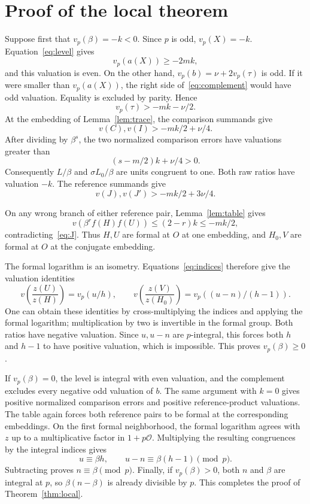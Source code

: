 \documentclass[11pt,a4paper]{article}
\begin{document}
\section{Proof of the local theorem}

Suppose first that $v_p(\beta)=-k<0$. Since $p$ is odd,
$v_p(X)=-k$. Equation~\eqref{eq:level} gives
\[
                     v_p(a(X))\ge-2mk,
\]
and this valuation is even. On the other hand,
$v_p(b)=\nu+2v_p(\tau)$ is odd. If it were smaller than
$v_p(a(X))$, the right side of~\eqref{eq:complement} would
have odd valuation. Equality is excluded by parity. Hence
\begin{equation}\label{eq:tau}
                         v_p(\tau)>-mk-\nu/2.
\end{equation}
At the embedding of Lemma~\ref{lem:trace}, the comparison summands give
\[
 v(C),v(I)>-mk/2+\nu/4.
\]
After dividing by $\beta^s$, the two normalized comparison errors
have valuations greater than
\[
                           (s-m/2)k+\nu/4>0.
\]
Consequently $L/\beta$ and $\sigma L_0/\beta$ are units congruent
to one. Both raw ratios have valuation $-k$.
The reference summands give
\begin{equation}\label{eq:J}
                        v(J),v(J')>-mk/2+3\nu/4.
\end{equation}

On any wrong branch of either reference pair,
Lemma~\ref{lem:table} gives
\[
                 v(\beta^r f(H)f(U))\le(2-r)k\le-mk/2,
\]
contradicting~\eqref{eq:J}. Thus $H,U$ are formal at $O$ at one
embedding, and $H_0,V$ are formal at $O$ at the conjugate embedding.

The formal logarithm is an isometry. Equations~\eqref{eq:indices}
therefore give the valuation identities
\[
 v\!\left(\frac{z(U)}{z(H)}\right)=v_p(u/h),\qquad
 v\!\left(\frac{z(V)}{z(H_0)}\right)
                              =v_p((u-n)/(h-1)).
\]
One can obtain these identities by cross-multiplying the indices
and applying the formal logarithm; multiplication by two is
invertible in the formal group. Both ratios have negative valuation.
Since $u,u-n$ are $p$-integral, this forces both $h$ and $h-1$
to have positive valuation, which is impossible. This proves
$v_p(\beta)\ge0$.

If $v_p(\beta)=0$, the level is integral with even valuation, and
the complement excludes every negative odd valuation of $b$.
The same argument with $k=0$ gives positive normalized comparison
errors and positive reference-product valuations. The table again
forces both reference pairs to be formal at the corresponding
embeddings. On the first formal neighborhood, the formal logarithm
agrees with $z$ up to a multiplicative factor in $1+p\mathcal O$.
Multiplying the resulting congruences by the integral indices gives
\[
                    u\equiv\beta h,\qquad
                    u-n\equiv\beta(h-1)\pmod p.
\]
Subtracting proves $n\equiv\beta\pmod p$.
Finally, if $v_p(\beta)>0$, both $n$ and $\beta$ are integral at
$p$, so $\beta(n-\beta)$ is already divisible by $p$.
This completes the proof of Theorem~\ref{thm:local}.
\end{document}
